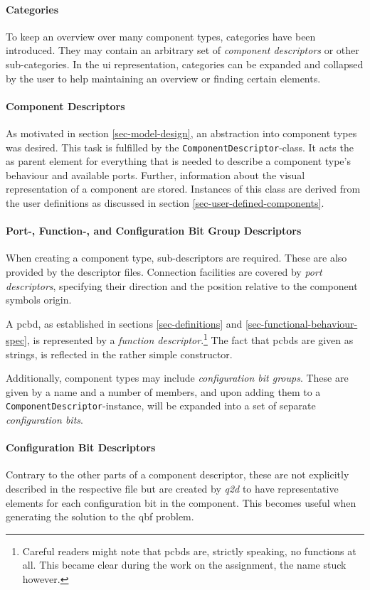 	\paragraph{Categories}
	To keep an overview over many component types, categories have been introduced.
	They may contain an arbitrary set of \emph{component descriptors} or other sub-categories.
	In the \gls{ui} representation, categories can be expanded and collapsed by the user to help maintaining an overview or finding certain elements.
	
	\paragraph{Component Descriptors}
	As motivated in section \ref{sec-model-design}, an abstraction into component types was desired.
	This task is fulfilled by the \texttt{ComponentDescriptor}-class.
	It acts the as parent element for everything that is needed to describe a component type's behaviour and available ports.
	Further, information about the visual representation of a component are stored.
	Instances of this class are derived from the user definitions as discussed in section \ref{sec-user-defined-components}.
	
	\paragraph{Port-, Function-, and Configuration Bit Group Descriptors}
	When creating a component type, sub-descriptors are required.
	These are also provided by the descriptor files.
	Connection facilities are covered by \emph{port descriptors}, specifying their direction and the position relative to the component symbols origin.
	
	A \gls{pcbd}, as established in sections \ref{sec-definitions} and \ref{sec-functional-behaviour-spec}, is represented by a \emph{function descriptor}.\footnote{
		Careful readers might note that \glspl{pcbd} are, strictly speaking, no functions at all.
		This became clear during the work on the assignment, the name stuck however.
	}
	The fact that \glspl{pcbd} are given as strings, is reflected in the rather simple constructor.

	Additionally, component types may include \emph{configuration bit groups}.
	These are given by a name and a number of members, and upon adding them to a \texttt{ComponentDescriptor}-instance, will be expanded into a set of separate \emph{configuration bits}.
	
	\paragraph{Configuration Bit Descriptors}
	Contrary to the other parts of a component descriptor, these are not explicitly described in the respective file but are created by \emph{q2d} to have representative elements for each configuration bit in the component.
	This becomes useful when generating the solution to the \gls{qbf} problem.
	
	
	